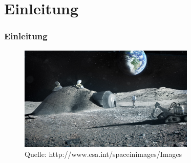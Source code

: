 \section{Einleitung}
\begin{frame}
	\frametitle{Einleitung}
	
	\begin{figure}
	   	\centering
	   	\includegraphics[height = 5cm]{../images/presentation/LunarBaseESA.jpg}
	   	\caption{Quelle: http://www.esa.int/spaceinimages/Images}
	\end{figure}
	

\end{frame} 


